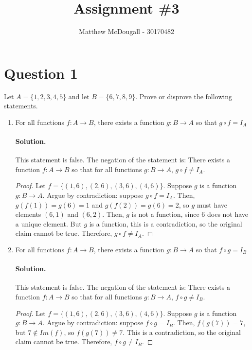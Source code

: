 \documentclass[12pt]{article}
\title{Assignment \#3}
\author{Matthew McDougall - 30170482}
\begin{document}
\maketitle

\section*{Question 1}
Let $A = \{1, 2, 3, 4, 5\}$ and let $B = \{6, 7, 8, 9\}$. \newline
Prove or disprove the following statements.
\begin{enumerate}[label=\textbf{\alph*.}]
    
    \item For all functions $f : A \rightarrow B$, there exists a function $g : B \rightarrow A$ so that $g \circ f = I_A$
    \paragraph*{Solution.} This statement is false. The negation of the statement is: There exists a function $f : A \rightarrow B$ so that for all functions $g : B \rightarrow A$, $g \circ f \neq I_A$.

    \begin{proof}
        Let $f = \{(1, 6), (2, 6), (3, 6), (4, 6)\}$. Suppose $g$ is a function $g : B \rightarrow A$. Argue by contradiction: suppose $g \circ f = I_A$. Then, $g(f(1)) = g(6) = 1$ and $g(f(2)) = g(6) = 2$, so $g$ must have elements $(6,1)$ and $(6,2)$. Then, $g$ is not a function, since $6$ does not have a unique element. But $g$ is a function, this is a contradiction, so the original claim cannot be true. Therefore, $g \circ f \neq I_A$.
    \end{proof}

    \item For all functions $f : A \rightarrow B$, there exists a function $g : B \rightarrow A$ so that $f \circ g = I_B$
    \paragraph*{Solution.} This statement is false. The negation of the statement is: There exists a function $f : A \rightarrow B$ so that for all functions $g : B \rightarrow A$, $f \circ g \neq I_B$.

    \begin{proof}
        Let $f = \{(1, 6), (2, 6), (3, 6), (4, 6)\}$. Suppose $g$ is a function $g : B \rightarrow A$. Argue by contradiction: suppose $f \circ g = I_B$. Then, $f(g(7)) = 7$, but $7 \not\in Im(f)$, so $f(g(7)) \neq 7$. This is a contradiction, so the original claim cannot be true. Therefore, $f \circ g \neq I_B$.
        

\end{proof}
\end{enumerate}
\end{document}
